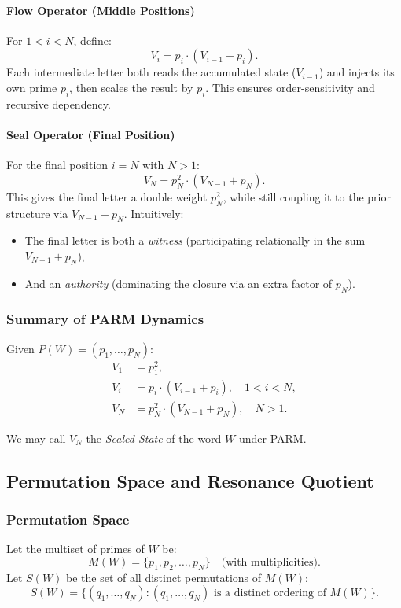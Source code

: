 \documentclass[11pt]{article}
\begin{document}
\paragraph{Flow Operator (Middle Positions)}
For $1 < i < N$, define:
\[
V_i = p_i \cdot (V_{i-1} + p_i).
\]
Each intermediate letter both reads the accumulated state ($V_{i-1}$) and injects its own prime $p_i$, then scales the result by $p_i$. This ensures order-sensitivity and recursive dependency.

\paragraph{Seal Operator (Final Position)}
For the final position $i = N$ with $N > 1$:
\[
V_N = p_N^2 \cdot (V_{N-1} + p_N).
\]
This gives the final letter a double weight $p_N^2$, while still coupling it to the prior structure via $V_{N-1}+p_N$. Intuitively:
\begin{itemize}
    \item The final letter is both a \emph{witness} (participating relationally in the sum $V_{N-1}+p_N$),
    \item And an \emph{authority} (dominating the closure via an extra factor of $p_N$).
\end{itemize}

\subsubsection{Summary of PARM Dynamics}

Given $P(W) = (p_1,\dots,p_N)$:
\begin{align}
V_1 &= p_1^2, \\
V_i &= p_i \cdot (V_{i-1} + p_i), \quad 1 < i < N, \\
V_N &= p_N^2 \cdot (V_{N-1} + p_N), \quad N > 1.
\end{align}

We may call $V_N$ the \emph{Sealed State} of the word $W$ under PARM.

\subsection{Permutation Space and Resonance Quotient}

\subsubsection{Permutation Space}

Let the multiset of primes of $W$ be:
\[
M(W) = \{p_1, p_2, \dots, p_N\} \quad \text{(with multiplicities)}.
\]
Let $S(W)$ be the set of all distinct permutations of $M(W)$:
\[
S(W) = \{(q_1,\dots,q_N) : (q_1,\dots,q_N) \text{ is a distinct ordering of } M(W)\}.
\]
\end{document}
